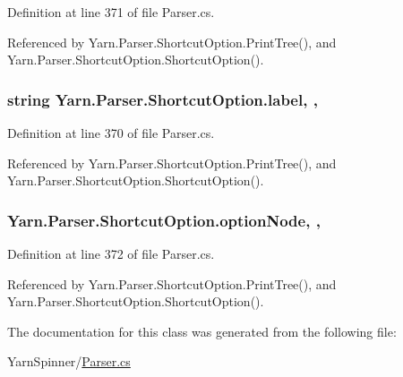 Definition at line 371 of file Parser.\-cs.



Referenced by Yarn.\-Parser.\-Shortcut\-Option.\-Print\-Tree(), and Yarn.\-Parser.\-Shortcut\-Option.\-Shortcut\-Option().

\hypertarget{a00159_ab43ec731479a56891389f6ece87f5f62}{
\subsubsection[{label}]{\setlength{\rightskip}{0pt plus 5cm}string Yarn.\-Parser.\-Shortcut\-Option.\-label\hspace{0.3cm}{\ttfamily [get]}, {\ttfamily [set]}, {\ttfamily [package]}}}\label{a00159_ab43ec731479a56891389f6ece87f5f62}


Definition at line 370 of file Parser.\-cs.



Referenced by Yarn.\-Parser.\-Shortcut\-Option.\-Print\-Tree(), and Yarn.\-Parser.\-Shortcut\-Option.\-Shortcut\-Option().

\hypertarget{a00159_a33d667370031f58b054b79a39891c3f3}{
\subsubsection[{option\-Node}]{ Yarn.\-Parser.\-Shortcut\-Option.\-option\-Node\hspace{0.3cm}{\ttfamily [get]}, {\ttfamily [set]}, {\ttfamily [package]}}}\label{a00159_a33d667370031f58b054b79a39891c3f3}


Definition at line 372 of file Parser.\-cs.



Referenced by Yarn.\-Parser.\-Shortcut\-Option.\-Print\-Tree(), and Yarn.\-Parser.\-Shortcut\-Option.\-Shortcut\-Option().



The documentation for this class was generated from the following file\-:\begin{DoxyCompactItemize}
\item 
Yarn\-Spinner/\hyperlink{a00313}{Parser.\-cs}\end{DoxyCompactItemize}
